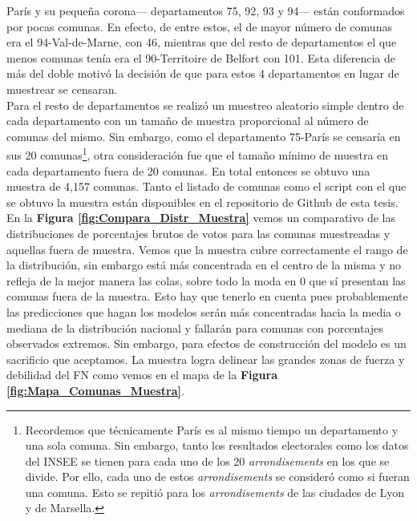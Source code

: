 París y su pequeña corona--- departamentos 75, 92, 93 y 94--- están conformados por pocas comunas. En efecto, de entre estos, el de mayor número de comunas era el 94-Val-de-Marne, con 46, mientras que del resto de departamentos el que menos comunas tenía era el 90-Territoire de Belfort con 101. Esta diferencia de más del doble motivó la decisión de que para estos 4 departamentos en lugar de muestrear se censaran.\\

Para el resto de departamentos se realizó un muestreo aleatorio simple dentro de cada departamento con un tamaño de muestra proporcional al número de comunas del mismo. Sin embargo, como el departamento 75-París se censaría en sus 20 comunas\footnote{Recordemos que técnicamente París es al mismo tiempo un departamento y una sola comuna. Sin embargo, tanto los resultados electorales como los datos del INSEE se tienen para cada uno de los 20 \textit{arrondisements} en los que se divide. Por ello, cada uno de estos \textit{arrondisements} se consideró como si fueran una comuna. Esto se repitió para los \textit{arrondisements} de las ciudades de Lyon y de Marsella.}, otra consideración fue que el tamaño mínimo de muestra en cada departamento fuera de 20 comunas. En total entonces se obtuvo una muestra de 4,157 comunas. {\color{Red} Tanto el listado de comunas como el script con el que se obtuvo la muestra están disponibles en el repositorio de Github de esta tesis.}\\

En la \textbf{Figura \ref{fig:Compara_Distr_Muestra}} vemos un comparativo de las distribuciones de porcentajes brutos de votos para las comunas muestreadas y aquellas fuera de muestra. Vemos que la muestra cubre correctamente el rango de la distribución, sin embargo está más concentrada en el centro de la misma y no refleja de la mejor manera las colas, sobre todo la moda en 0 que sí presentan las comunas fuera de la muestra. Esto hay que tenerlo en cuenta pues probablemente las predicciones que hagan los modelos serán más concentradas hacia la media o mediana de la distribución nacional y fallarán para comunas con porcentajes observados extremos. Sin embargo, para efectos de construcción del modelo es un sacrificio que aceptamos. La muestra logra delinear las grandes zonas de fuerza y debilidad del FN como vemos en el mapa de la \textbf{Figura \ref{fig:Mapa_Comunas_Muestra}}.\\
 
